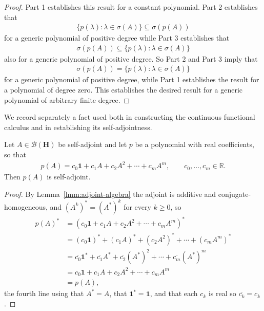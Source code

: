 \begin{proof}
Part 1 establishes this result for a constant polynomial. Part 2 establishes that
\begin{align}
    \{ p(\lambda) : \lambda \in \sigma(A) \} \subseteq \sigma(p(A))
\end{align}
for a generic polynomial of positive degree while Part 3 establishes that
\begin{align}
    \sigma(p(A)) \subseteq \{ p(\lambda) : \lambda \in \sigma(A) \}
\end{align}
also for a generic polynomial of positive degree. So Part 2 and Part 3 imply that
\begin{align}
    \sigma(p(A)) = \{ p(\lambda) : \lambda \in \sigma(A) \}
\end{align}
for a generic polynomial of positive degree, while Part 1 establishes the result for a polynomial of degree zero. This establishes the desired result for a generic polynomial of arbitrary finite degree.
\end{proof}

We record separately a fact used both in constructing the continuous functional calculus and in establishing its self-adjointness.

\begin{lemma}
    \label{lmm:real-polynomial-self-adjoint}
    \leanok
    Let $A \in \mathcal{B}(\mathbf{H})$ be self-adjoint and let $p$ be a polynomial with real coefficients, so that
    \begin{align}
        p(A) = c_0 \mathbf{1} + c_1 A + c_2 A^2 + \cdots + c_m A^m, \qquad c_0, \ldots, c_m \in \mathbb{R}.
    \end{align}
    Then $p(A)$ is self-adjoint.
\end{lemma}
\begin{proof}
    \leanok
By Lemma~\ref{lmm:adjoint-algebra} the adjoint is additive and conjugate-homogeneous, and $(A^k)^* = (A^*)^k$ for every $k \ge 0$, so
\begin{align}
    p(A)^* &= \left( c_0 \mathbf{1} + c_1 A + c_2 A^2 + \cdots + c_m A^m \right)^* \\
           &= (c_0 \mathbf{1})^* + (c_1 A)^* + (c_2 A^2)^* + \cdots + (c_m A^m)^* \\
           &= \overline{c_0} \mathbf{1}^* + \overline{c_1} A^* + \overline{c_2} (A^*)^2 + \cdots + \overline{c_m} (A^*)^m \\
           &= c_0 \mathbf{1} + c_1 A + c_2 A^2 + \cdots + c_m A^m \\
           &= p(A),
\end{align}
the fourth line using that $A^* = A$, that $\mathbf{1}^* = \mathbf{1}$, and that each $c_k$ is real so $\overline{c_k} = c_k$.
\end{proof}


